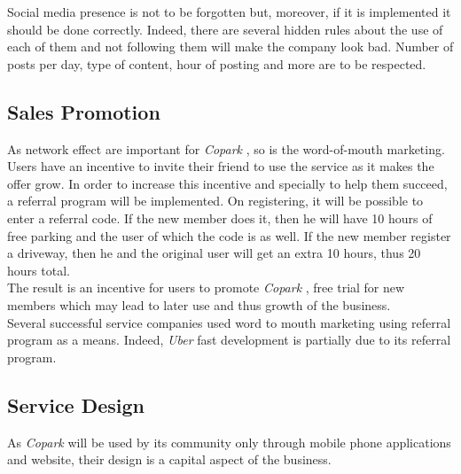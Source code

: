 \documentclass[12pt,a4paper,oneside]{book}
\newcommand{\bp}{\textit{Copark }}
\begin{document}
Social media presence is not to be forgotten but, moreover, if it is implemented it should be done correctly. Indeed, there are several hidden rules about the use of each of them and not following them will make the company look bad. Number of posts per day, type of content, hour of posting and more are to be respected.\cite{smrules}

\subsection{Sales Promotion}
As network effect are important for \bp, so is the word-of-mouth marketing.\\
Users have an incentive to invite their friend to use the service as it makes the offer grow. In order to increase this incentive and specially to help them succeed, a referral program will be implemented. On registering, it will be possible to enter a referral code. If the new member does it, then he will have 10 hours of free parking and the user of which the code is as well. If the new member register a driveway, then he and the original user will get an extra 10 hours, thus 20 hours total.\\
The result is an incentive for users to promote \bp, free trial for new members which may lead to later use and thus growth of the business.\\

Several successful service companies used word to mouth marketing using referral program as a means. Indeed, \textit{Uber} fast development is partially due to its referral program.\cite{uberef}

\subsection{Service Design}
As \bp will be used by its community only through mobile phone applications and website, their design is a capital aspect of the business.\\
\end{document}
